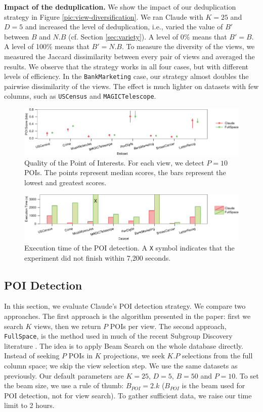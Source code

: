 \textbf{Impact of the deduplication.} We show the impact of our deduplication
strategy in Figure \ref{pic:view-diversification}.  We ran Claude with $K=25$
and $D=5$ and increased the level of deduplication, i.e., varied the value of
$B'$ between $B$ and $N.B$ (cf. Section \ref{sec:variety}). A level of 0\%
means that $B'=B$. A level of 100\% means that $B'=N.B$. To measure the
diversity of the views, we measured the Jaccard dissimilarity between every
pair of views and averaged the results. We observe that the strategy works in
all four cases, but with different levels of efficiency. In the
\texttt{BankMarketing} case, our strategy almost doubles the pairwise
dissimilarity of the views. The effect is much lighter on datasets with few
columns, such as \texttt{USCensus} and \texttt{MAGICTelescope}.
\begin{figure}[t!]
\centering
\includegraphics[width=1.8\columnwidth]{plots/POI-score}
\caption{Quality of the Point of Interests. For each view, we detect $P=10$
POIs. The
    points represent median scores, the bars represent the lowest and greatest
    scores.}
\label{pic:POI-quali}
\end{figure}
\begin{figure}[t!]
\centering
\includegraphics[width=1.8\columnwidth]{plots/POI-timing}
\caption{Execution time of the POI detection. A \texttt{X} symbol
indicates that the experiment did not finish within 7,200 seconds.}
\label{pic:POI-time}
\end{figure}

\subsection{POI Detection}
\label{sec:exp-poi}

In this section, we evaluate Claude's POI detection strategy. We compare two
approaches. The first approach is the algorithm presented in the paper: first
we search $K$ views, then we return $P$ POIs per view. The second approach,
\texttt{FullSpace}, is the method used in much of the recent Subgroup Discovery
literature \cite{van2011non, duivesteijn2010subgroup}.  The idea is to apply
Beam Search on the whole database directly. Instead of seeking $P$ POIs in $K$
projections, we seek $K.P$ selections from the full column space; we skip the
view selection step. We use the same datasets as previously. Our default
parameters are $K=25$, $D=5$, $B=50$ and $P=10$. To set the beam size, we use a
rule of thumb: $B_{POI} = 2.k$ ($B_{POI}$ is the beam used for POI detection,
not for view search). To gather sufficient data, we raise our time limit to 2
hours. 

